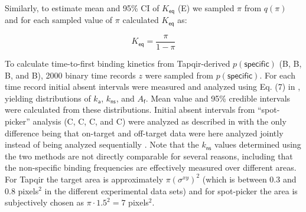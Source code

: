 Similarly, to estimate mean and 95\% CI of $K_\mathsf{eq}$ (E) we sampled $\pi$ from $q(\pi)$ and for each sampled value of $\pi$ calculated $K_\mathsf{eq}$ as:

\begin{equation}
    K_\mathsf{eq} = \dfrac{\pi}{1 - \pi}
\end{equation}

To calculate  time-to-first binding kinetics from Tapqir-derived $p(\mathsf{specific})$ (B, B, B, and B), 2000 binary time records $z$ were sampled from $p(\mathsf{specific})$. For each time record initial absent intervals were measured and analyzed using Eq. (7) in \cite{Friedman2015-nx}, yielding distributions of $k_\mathsf{a}$, $k_\mathsf{ns}$, and $A_\mathsf{f}$. Mean value and 95\% credible intervals were calculated from these distributions. Initial absent intervals from ``spot-picker'' analysis (C, C, C, and C) were analyzed as described in \citep{Friedman2015-nx} with the only difference being that on-target and off-target data were here analyzed jointly instead of being analyzed sequentially \citep{Friedman2015-nx}.  Note that the $k_\mathsf{ns}$ values determined using the two methods are not directly comparable for several reasons, including that the non-specific binding frequencies are effectively measured over different areas. For Tapqir the target area is approximately $ \pi \left( \sigma^{xy} \right) ^2$ (which is between 0.3 and 0.8 pixels$^2$ in the different experimental data sets) and for spot-picker the area is subjectively chosen as $\pi \cdot 1.5^2 = 7$ pixels$^2$.



